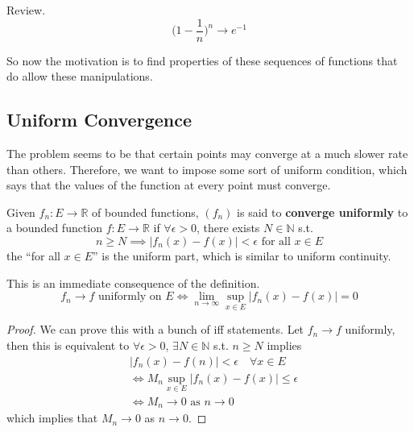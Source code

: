   \begin{example}
    Review. 
    \begin{equation}
      \bigg( 1 - \frac{1}{n} \bigg)^n \to e^{-1}
    \end{equation}
  \end{example}

  So now the motivation is to find properties of these sequences of functions that do allow these manipulations. 

\subsection{Uniform Convergence}

  The problem seems to be that certain points may converge at a much slower rate than others. Therefore, we want to impose some sort of uniform condition, which says that the values of the function at every point must converge. 

  \begin{definition}
    \label{def:uniform-convergence}
    Given $f_n : E \to \mathbb{R}$ of bounded functions, $(f_n)$ is said to \textbf{converge uniformly} to a bounded function $f: E \to \mathbb{R}$ if $\forall \epsilon > 0$, there exists $N \in \mathbb{N}$ s.t. 
    \begin{equation}
      n \geq N \implies |f_n (x) - f(x) | < \epsilon \text{ for all } x \in E
    \end{equation}
    the ``for all $x \in E$'' is the uniform part, which is similar to uniform continuity. 
  \end{definition}

  \begin{theorem}
    This is an immediate consequence of the definition. 
    \begin{equation}
      f_n \to f \text{ uniformly on } E \iff \lim_{n \to \infty} \sup_{x \in E} |f_n (x) - f(x)| = 0
    \end{equation}
  \end{theorem}
  \begin{proof}
    We can prove this with a bunch of iff statements. Let $f_n \to f$ uniformly, then this is equivalent to $\forall \epsilon > 0$, $\exists N \in \mathbb{N}$ s.t. $n \geq N$ implies
    \begin{align}
      & |f_n (x) - f(n)| < \epsilon \quad \forall x \in E \\ 
      & \iff M_n \sup_{x \in E} |f_n (x) - f(x)| \leq \epsilon \\ 
      & \iff M_n \to 0 \text{ as } n \to 0
    \end{align}
    which implies that $M_n \to 0$ as $n \to 0$. 
  \end{proof}

